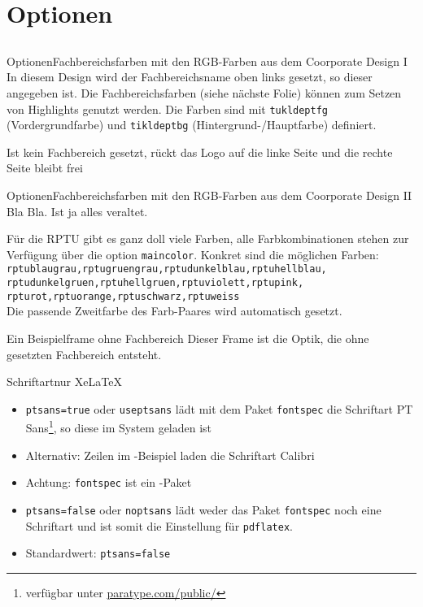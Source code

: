 \documentclass[german,10pt,xcolor=colortbl,compress
]{beamer}
\begin{document}
\section{Optionen}
\subsection*{}
\begin{frame}{Optionen}{Fachbereichsfarben mit den RGB-Farben aus dem Coorporate Design I}
	In diesem Design wird der Fachbereichsname oben links gesetzt, so dieser angegeben ist. Die Fachbereichsfarben (siehe nächste Folie) können zum Setzen von Highlights genutzt werden. Die Farben sind mit \lstinline!tukldeptfg! (Vordergrundfarbe) und \lstinline!tikldeptbg! (Hintergrund-/Hauptfarbe) definiert.

	Ist kein Fachbereich gesetzt, rückt das Logo auf die linke Seite und die rechte Seite bleibt frei
\end{frame}
\begin{frame}{Optionen}{Fachbereichsfarben mit den RGB-Farben aus dem Coorporate Design II}
	Bla Bla. Ist ja alles veraltet. \par
	Für die RPTU gibt es ganz doll viele Farben, alle Farbkombinationen stehen zur Verfügung über die option \lstinline|maincolor|. Konkret sind die möglichen Farben:
	\lstinline|rptublaugrau,rptugruengrau,rptudunkelblau,rptuhellblau,|
	\lstinline|rptudunkelgruen,rptuhellgruen,rptuviolett,rptupink,|
	\lstinline|rpturot,rptuorange,rptuschwarz,rptuweiss| \\%
	Die passende Zweitfarbe des Farb-Paares wird automatisch gesetzt.
\end{frame}
\fbsetfalse
\begin{frame}{Ein Beispielframe ohne Fachbereich}
	Dieser Frame ist die Optik, die ohne gesetzten Fachbereich entsteht.
\end{frame}
\fbsettrue
\begin{frame}{Schriftart}{nur XeLaTeX}
	\begin{itemize}
		\item \lstinline|ptsans=true| oder \lstinline|useptsans| lädt mit dem Paket \lstinline|fontspec| die Schriftart PT Sans\footnote{verfügbar unter \href{http://www.paratype.com/public/}{paratype.com/public/}}, so diese im System geladen ist
		\item Alternativ: Zeilen im \XeLaTeX-Beispiel laden die Schriftart Calibri
		\item Achtung: \lstinline|fontspec| ist ein \XeLaTeX-Paket
		\item \lstinline|ptsans=false| oder \lstinline|noptsans| lädt weder das Paket \lstinline|fontspec| noch eine Schriftart und ist somit die Einstellung für \lstinline!pdflatex!.
		\item Standardwert: \lstinline|ptsans=false|
	\end{itemize}
\end{frame}
\end{document}
